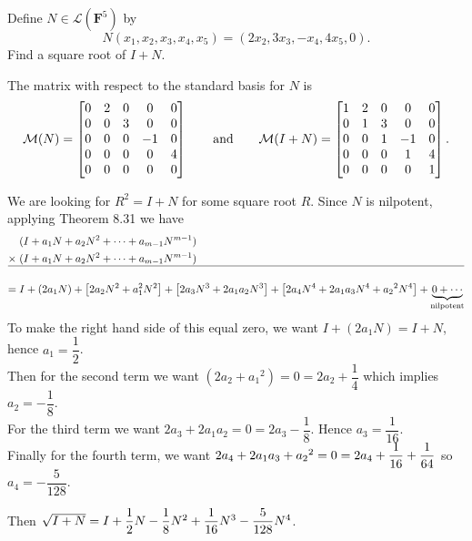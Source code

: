 Define $N \in \mathcal{L}(\mathbf{F}^5)$ by
    \[
       N(x_1,x_2,x_3,x_4,x_5) = (2x_2,3x_3,-x_4,4x_5,0).
    \]
    Find a square root of $I+N$.

    \soln* The matrix with respect to the standard basis for $N$ is 
    $$\mathcal{M}(N) = \begin{bmatrix}
       0 & 2 & 0 & 0 & 0 \\
       0 & 0 & 3 & 0 & 0 \\
       0 & 0 & 0 & -1 & 0 \\
       0 & 0 & 0 & 0 & 4 \\
       0 & 0 & 0 & 0 & 0
    \end{bmatrix}
    \qquad \text{and} \qquad \mathcal{M}(I+N) = \begin{bmatrix}
      1 & 2 & 0 & 0 & 0 \\
      0 & 1 & 3 & 0 & 0 \\
      0 & 0 & 1 & -1 & 0 \\
      0 & 0 & 0 & 1 & 4 \\
      0 & 0 & 0 & 0 & 1
   \end{bmatrix}.$$

   \noindent We are looking for $R^2 = I+N$ for some square root $R$. Since $N$ is nilpotent, applying Theorem 8.31 we have 
   \begin{align*}
      & (I + a_1N + a_2N^2 + \cdots + a_{m-1}N^{m-1})\\
      \times \; & (I + a_1N + a_2N^2 + \cdots + a_{m-1}N^{m-1})\\
      \hline\\
      =\;&I + (2a_1N) + \brac{2a_2N^2 + a_1^2N^2} + \brac{
         2a_3N^3 + 2a_1a_2N^3
      } + \brac {
         2a_4 N^4 + 2a_1 a_3 N^4 + {a_2}^2 N^4
      } + \underbrace{ 0 + \cdots}_{\text{nilpotent}} 
   \end{align*}
   To make the right hand side of this equal zero, we want $I + (2a_1 N) = I + N$, hence $a_1 = \dfrac{1}{2}$. 
   \\ Then for the second term we want $(2a_2 + {a_1}^2) = 0 = 2a_2 + \dfrac{1}{4}$ which implies $a_2 = - \dfrac{1}{8}$.
   \\For the third term we want $2a_3 + 2a_1a_2 = 0 = 2a_3 - \dfrac{1}{8}$. Hence $a_3 = \dfrac{1}{16}$.
   \\Finally for the fourth term, we want $2a_4 + 2a_1a_3 + {a_2}^2 = 0 = 2a_4 + \over*{16} + \over*{64}$ so $a_4 = - \dfrac{5}{128}$.

   \nl Then $\sqrt{I+N} = I + \over*{2} N - \over*{8} N^2 + \over*{16} N^3 - \dfrac{5}{128}N^4$.